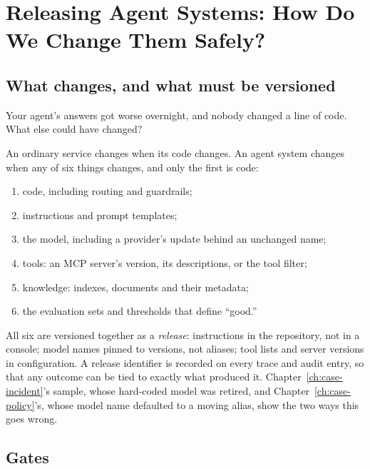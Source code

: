 
\section{Releasing Agent Systems: How Do We Change Them Safely?}
\label{sec:cap-release}

\subsection{What changes, and what must be versioned}

\begin{thinkabout}
Your agent's answers got worse overnight, and nobody changed a line of code. What else could have changed?
\end{thinkabout}

An ordinary service changes when its code changes. An agent system changes when any of six things changes, and only the first is code:
\begin{enumerate}[itemsep=1pt]
  \item code, including routing and guardrails;
  \item instructions and prompt templates;
  \item the model, including a provider's update behind an unchanged name;
  \item tools: an MCP server's version, its descriptions, or the tool filter;
  \item knowledge: indexes, documents and their metadata;
  \item the evaluation sets and thresholds that define ``good.''
\end{enumerate}
All six are versioned together as a \emph{release}: instructions in the repository, not in a console; model names pinned to versions, not aliases; tool lists and server versions in configuration. A release identifier is recorded on every trace and audit entry, so that any outcome can be tied to exactly what produced it. Chapter~\ref{ch:case-incident}'s sample, whose hard-coded model was retired, and Chapter~\ref{ch:case-policy}'s, whose model name defaulted to a moving alias, show the two ways this goes wrong.

\subsection{Gates}


